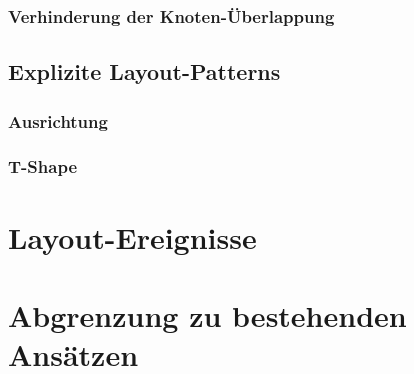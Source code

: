 \subsubsection{Verhinderung der Knoten-Überlappung}

\subsection{Explizite Layout-Patterns}


\subsubsection{Ausrichtung}


\subsubsection{T-Shape}


\section{Layout-Ereignisse}


\section{Abgrenzung zu bestehenden Ansätzen}

